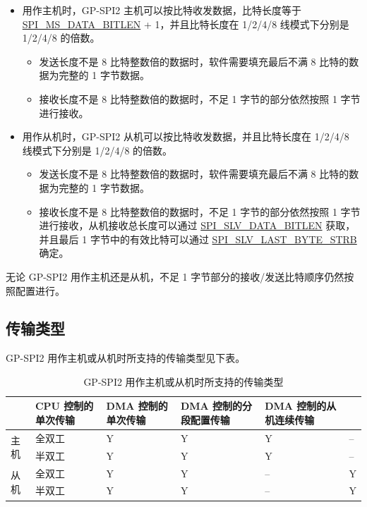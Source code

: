 \documentclass[main\_\_CN.tex]{subfiles}
\begin{document}
\begin{itemize}
    \item 用作主机时，GP-SPI2 主机可以按比特收发数据，比特长度等于   \hyperref[fielddesc:SPIMSDATABITLEN]{SPI\_MS\_DATA\_BITLEN} + 1，并且比特长度在 1/2/4/8 线模式下分别是 1/2/4/8 的倍数。
    \begin{itemize}
        \item 发送长度不是 8 比特整数倍的数据时，软件需要填充最后不满 8 比特的数据为完整的 1 字节数据。
        \item 接收长度不是 8 比特整数倍的数据时，不足 1 字节的部分依然按照 1 字节进行接收。
    \end{itemize}
    \item 用作从机时，GP-SPI2 从机可以按比特收发数据，并且比特长度在 1/2/4/8 线模式下分别是 1/2/4/8 的倍数。
    \begin{itemize}
        \item 发送长度不是 8 比特整数倍的数据时，软件需要填充最后不满 8 比特的数据为完整的 1 字节数据。
        \item 接收长度不是 8 比特整数倍的数据时，不足 1 字节的部分依然按照 1 字节进行接收，从机接收总长度可以通过 \hyperref[fielddesc:SPISLVDATABITLEN]{SPI\_SLV\_DATA\_BITLEN} 获取，并且最后 1 字节中的有效比特可以通过 \hyperref[fielddesc:SPISLVLASTBYTESTRB]{SPI\_SLV\_LAST\_BYTE\_STRB} 确定。
    \end{itemize}
\end{itemize}
\begin{tiplisting}
无论 GP-SPI2 用作主机还是从机，不足 1 字节部分的接收/发送比特顺序仍然按照配置进行。
\end{tiplisting}

\subsection{传输类型}

GP-SPI2 用作主机或从机时所支持的传输类型见下表。

\begin{table}[H]
    \centering
    \caption{GP-SPI2 用作主机或从机时所支持的传输类型}
    \label{tab:transfer-modes}
    \begin{threeparttable}
    \begin{tabular}{|l|l|p{2.3cm}<{\centering}|p{2.3cm}<{\centering}|p{3.3cm}<{\centering}|p{3.3cm}<{\centering}| }
    \hline
        \rowcolor{lightgray}
       \multicolumn{2}{l|}{\textbf{模式}}  & \textbf{CPU 控制的单次传输}  & \textbf{DMA 控制的单次传输} &   \textbf{DMA 控制的分段配置传输}    & \textbf{DMA 控制的从机连续传输} \\\hline
    \multirow{2}{*}{主机} & 全双工 & Y & Y & Y & --\\\cline{2-6}
    
    & 半双工 & Y & Y & Y & --\\\hline
    
    \multirow{2}{*}{从机} & 全双工 & Y & Y & -- &Y \\\cline{2-6}
    & 半双工 & Y & Y & -- &Y \\\hline
        \end{tabular}
     \end{threeparttable}
    \end{table}
\end{document}
